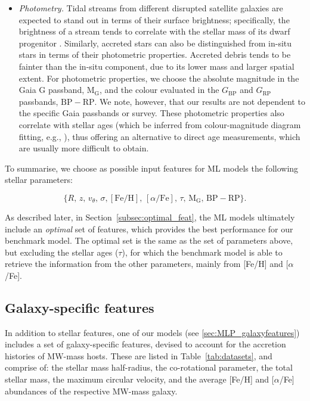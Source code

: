 \begin{itemize}
\item {\it Photometry.} Tidal streams from different disrupted satellite galaxies are expected to stand out in terms of their surface brightness; specifically, the brightness of a stream tends to correlate with the stellar mass of its dwarf progenitor \citep{Font2006b,Johnston2008,Gilbert2009,Cooper2010}. Similarly, accreted stars can also be distinguished from in-situ stars in terms of their photometric properties. Accreted debris tends to be fainter than the in-situ component, due to its lower mass and larger spatial extent. For photometric properties, we choose the absolute magnitude in the Gaia $\mathrm{G}$ passband, $\mathrm{M}_{\mathrm{G}}$, and the colour evaluated in the $G_{\mathrm{BP}}$ and $G_{\mathrm{RP}}$ passbands, ${\mathrm{BP}}-{\mathrm{RP}}$.  We note, however, that our results are not dependent to the specific Gaia passbands or survey.
These photometric properties also correlate with stellar ages (which be inferred from colour-magnitude diagram fitting, e.g., \citealt{Gallart2005}), thus offering an alternative to direct age measurements, which are usually more difficult to obtain.
\end{itemize}

To summarise, we choose as possible input features for ML models the following stellar parameters:

\begin{equation*}
\{R, \, z, \, v_{\theta}, \, \sigma, \mathrm{[Fe/H]}, \, [\alpha/\mathrm{Fe}], \, \tau,  \, \mathrm{M}_{\mathrm{G}}, \, {\mathrm{BP}}-{\mathrm{RP}} \}.
\end{equation*}

As described later, in Section~\ref{subsec:optimal_feat}, the ML models ultimately include an {\it optimal} set of features, which provides the best performance for our benchmark model. The optimal set is the same as the set of parameters above, but excluding the stellar ages ($\tau$), for which the benchmark model is able to retrieve the information from the other parameters, mainly from [Fe/H] and [$\alpha$/Fe].

\subsection{Galaxy-specific features}
\label{sec:galaxy_feature_selection}

In addition to stellar features, one of our models (see \ref{sec:MLP_galaxyfeatures})
 includes a set of galaxy-specific features, devised to account for the accretion histories of MW-mass hosts. These are listed in Table~\ref{tab:datasets}, and comprise of: the stellar mass half-radius, the co-rotational parameter, the total stellar mass, the maximum circular velocity, and the average [Fe/H] and [$\alpha$/Fe] abundances of the respective MW-mass galaxy.

